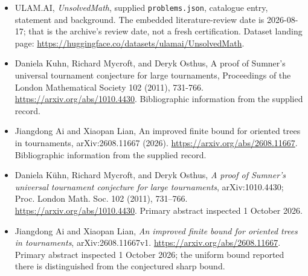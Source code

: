\documentclass[11pt,a4paper]{article}
\begin{document}
{\small

\begin{itemize}

\item[\hypertarget{source:statement:1}{S1}] ULAM.AI, \emph{UnsolvedMath}, supplied \texttt{problems.json}, catalogue entry, statement and background. The embedded literature-review date is 2026-08-17; that is the archive’s review date, not a fresh certification. Dataset landing page: \url{https://huggingface.co/datasets/ulamai/UnsolvedMath}.

\item[\hypertarget{source:statement:2}{S2}] Daniela Kuhn, Richard Mycroft, and Deryk Osthus, A proof of Sumner's universal tournament conjecture for large tournaments, Proceedings of the London Mathematical Society 102 (2011), 731-766. \url{https://arxiv.org/abs/1010.4430}. Bibliographic information from the supplied record.

\item[\hypertarget{source:statement:3}{S3}] Jiangdong Ai and Xiaopan Lian, An improved finite bound for oriented trees in tournaments, arXiv:2608.11667 (2026). \url{https://arxiv.org/abs/2608.11667}. Bibliographic information from the supplied record.


\item[E1] Daniela K\"uhn, Richard Mycroft, and Deryk
Osthus, \emph{A proof of Sumner's universal tournament conjecture for
large tournaments}, arXiv:1010.4430; Proc. London Math. Soc. 102 (2011),
731--766. \url{https://arxiv.org/abs/1010.4430}.
Primary abstract inspected 1 October 2026.
\item[E2] Jiangdong Ai and Xiaopan Lian, \emph{An improved finite
bound for oriented trees in tournaments}, arXiv:2608.11667v1.
\url{https://arxiv.org/abs/2608.11667}. Primary abstract inspected
1 October 2026; the uniform bound reported there is distinguished from
the conjectured sharp bound.

\end{itemize}

}

\label{end:statement}
\end{document}
